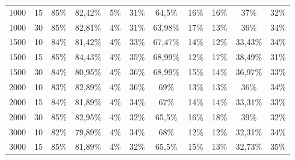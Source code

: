 \begin{table}[ht]
\begin{tabular}{cc|ccc|ccc|ccc}
        {1000}   & {15}     & {85\%}                              & {82,42\%}                           & {5\%}                                    & {31\%}        & {64,5\%}    & {16\%}      & {16\%}        & {37\%}      & {32\%}      \\
        {1000}   & {30}     & {85\%}                              & {82,81\%}                           & {4\%}                                    & {31\%}        & {63,98\%}   & {17\%}      & {13\%}        & {36\%}      & {34\%}      \\
        {1500}   & {10}     & {84\%}                              & {81,42\%}                           & {4\%}                                    & {33\%}        & {67,47\%}   & {14\%}      & {12\%}        & {33,43\%}   & {34\%}      \\
        {1500}   & {15}     & {85\%}                              & {84,43\%}                           & {4\%}                                    & {35\%}        & {68,99\%}   & {12\%}      & {17\%}        & {38,49\%}   & {31\%}      \\
        {1500}   & {30}     & {84\%}                              & {80,95\%}                           & {4\%}                                    & {36\%}        & {68,99\%}   & {15\%}      & {14\%}        & {36,97\%}   & {33\%}      \\
        {2000}   & {10}     & {83\%}                              & {82,89\%}                           & {4\%}                                    & {36\%}        & {69\%}      & {13\%}      & {13\%}        & {36\%}      & {34\%}      \\
        {2000}   & {15}     & {84\%}                              & {81,89\%}                           & {4\%}                                    & {34\%}        & {67\%}      & {14\%}      & {14\%}        & {33,31\%}   & {33\%}      \\
        {2000}   & {30}     & {85\%}                              & {82,95\%}                           & {4\%}                                    & {32\%}        & {65,5\%}    & {16\%}      & {18\%}        & {39\%}      & {32\%}      \\
        {3000}   & {10}     & {82\%}                              & {79,89\%}                           & {4\%}                                    & {34\%}        & {68\%}      & {12\%}      & {12\%}        & {32,31\%}   & {34\%}      \\
        {3000}   & {15}     & {85\%}                              & {81,89\%}                           & {4\%}                                    & {32\%}        & {65,5\%}    & {15\%}      & {13\%}        & {32,73\%}   & {35\%}      \\

\end{tabular}
\end{table}
